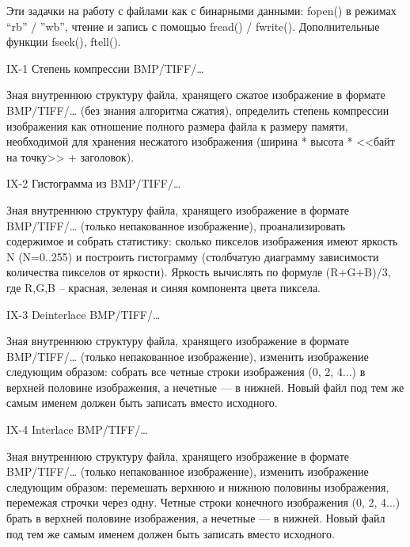 Эти задачки на работу с файлами как с бинарными данными: fopen() в режимах
“rb” / ”wb”, чтение и запись с помощью fread() / fwrite(). Дополнительные
функции fseek(), ftell().


IX-1 Степень компрессии BMP/TIFF/…

Зная внутреннюю структуру файла, хранящего сжатое изображение в формате
BMP/TIFF/… (без знания алгоритма сжатия), определить степень компрессии
изображения как отношение полного размера файла к размеру памяти, необходимой
для хранения несжатого изображения (ширина * высота * <<байт на точку>> +
заголовок).


IX-2 Гистограмма из BMP/TIFF/…

Зная внутреннюю структуру файла, хранящего изображение в формате BMP/TIFF/…
(только непакованное изображение), проанализировать содержимое и собрать
статистику: сколько пикселов изображения имеют яркость N (N=0..255) и
построить гистограмму (столбчатую диаграмму зависимости количества пикселов от
яркости). Яркость вычислять по формуле (R+G+B)/3, где R,G,B – красная, зеленая
и синяя компонента цвета пиксела.


IX-3 Deinterlace BMP/TIFF/…

Зная внутреннюю структуру файла, хранящего изображение в формате BMP/TIFF/…
(только непакованное изображение), изменить изображение следующим образом:
собрать все четные строки изображения (0, 2, 4...) в верхней половине
изображения, а нечетные — в нижней. Новый файл под тем же самым именем должен
быть записать вместо исходного.


IX-4 Interlace BMP/TIFF/…

Зная внутреннюю структуру файла, хранящего изображение в формате BMP/TIFF/…
(только непакованное изображение), изменить изображение следующим образом:
перемешать верхнюю и нижнюю половины изображения, перемежая строчки через
одну. Четные строки конечного изображения (0, 2, 4...) брать в верхней
половине изображения, а нечетные — в нижней. Новый файл под тем же самым
именем должен быть записать вместо исходного.


